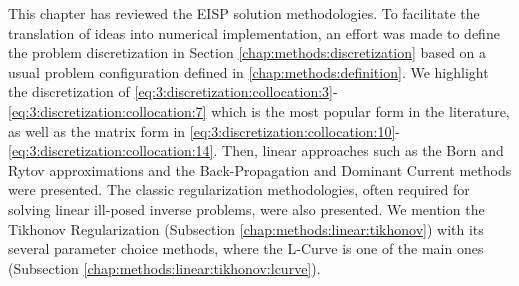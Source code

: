 		This chapter has reviewed the EISP solution methodologies. To facilitate the translation of ideas into numerical implementation, an effort was made to define the problem discretization in Section \ref{chap:methods:discretization} based on a usual problem configuration defined in \ref{chap:methods:definition}. We highlight the discretization of \eqref{eq:3:discretization:collocation:3}-\eqref{eq:3:discretization:collocation:7} which is the most popular form in the literature, as well as the matrix form in \eqref{eq:3:discretization:collocation:10}-\eqref{eq:3:discretization:collocation:14}. Then, linear approaches such as the Born and Rytov approximations and the Back-Propagation and Dominant Current methods were presented. The classic regularization methodologies, often required for solving linear ill-posed inverse problems, were also presented. We mention the Tikhonov Regularization (Subsection \ref{chap:methods:linear:tikhonov}) with its several parameter choice methods, where the L-Curve is one of the main ones (Subsection  \ref{chap:methods:linear:tikhonov:lcurve}).
		
